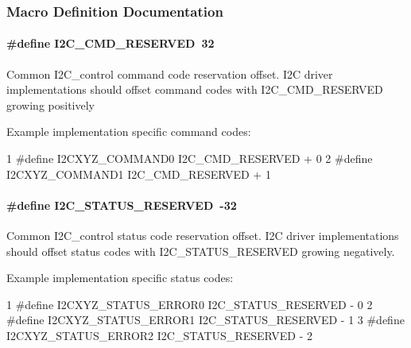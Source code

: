 \subsubsection{Macro Definition Documentation}
\paragraph[{I2\+C\+\_\+\+C\+M\+D\+\_\+\+R\+E\+S\+E\+R\+V\+E\+D}]{\setlength{\rightskip}{0pt plus 5cm}\#define I2\+C\+\_\+\+C\+M\+D\+\_\+\+R\+E\+S\+E\+R\+V\+E\+D~32}\label{_i2_c_8h_a760ec0a6fdb876ccc67b6f06301d53ec}
Common I2\+C\+\_\+control command code reservation offset. I2\+C driver implementations should offset command codes with I2\+C\+\_\+\+C\+M\+D\+\_\+\+R\+E\+S\+E\+R\+V\+E\+D growing positively

Example implementation specific command codes\+: 
\begin{DoxyCode}
1 #define I2CXYZ\_COMMAND0          I2C\_CMD\_RESERVED + 0
2 #define I2CXYZ\_COMMAND1          I2C\_CMD\_RESERVED + 1
\end{DoxyCode}
\paragraph[{I2\+C\+\_\+\+S\+T\+A\+T\+U\+S\+\_\+\+R\+E\+S\+E\+R\+V\+E\+D}]{\setlength{\rightskip}{0pt plus 5cm}\#define I2\+C\+\_\+\+S\+T\+A\+T\+U\+S\+\_\+\+R\+E\+S\+E\+R\+V\+E\+D~-\/32}\label{_i2_c_8h_acfd04572fe349d087c2547501cbc7e0a}
Common I2\+C\+\_\+control status code reservation offset. I2\+C driver implementations should offset status codes with I2\+C\+\_\+\+S\+T\+A\+T\+U\+S\+\_\+\+R\+E\+S\+E\+R\+V\+E\+D growing negatively.

Example implementation specific status codes\+: 
\begin{DoxyCode}
1 #define I2CXYZ\_STATUS\_ERROR0     I2C\_STATUS\_RESERVED - 0
2 #define I2CXYZ\_STATUS\_ERROR1     I2C\_STATUS\_RESERVED - 1
3 #define I2CXYZ\_STATUS\_ERROR2     I2C\_STATUS\_RESERVED - 2
\end{DoxyCode}
